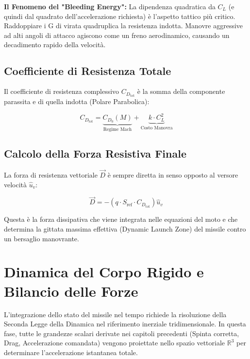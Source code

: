 \documentclass[12pt,a4paper]{article}
\begin{document}
\textbf{Il Fenomeno del "Bleeding Energy":}
La dipendenza quadratica da $C_L$ (e quindi dal quadrato dell'accelerazione richiesta) è l'aspetto tattico più critico. Raddoppiare i G di virata quadruplica la resistenza indotta. Manovre aggressive ad alti angoli di attacco agiscono come un freno aerodinamico, causando un decadimento rapido della velocità.

\subsection{Coefficiente di Resistenza Totale}
Il coefficiente di resistenza complessivo $C_{D_{\text{tot}}}$ è la somma della componente parassita e di quella indotta (Polare Parabolica):

\begin{equation}
    C_{D_{\text{tot}}} = \underbrace{C_{D_0}(M)}_{\text{Regime Mach}} + \underbrace{k \cdot C_L^2}_{\text{Costo Manovra}}
\end{equation}

\subsection{Calcolo della Forza Resistiva Finale}
La forza di resistenza vettoriale $\vec{D}$ è sempre diretta in senso opposto al versore velocità $\hat{u}_v$:

\begin{equation}
    \vec{D} = - \left( q \cdot S_{\text{ref}} \cdot C_{D_{\text{tot}}} \right) \hat{u}_v
\end{equation}

Questa è la forza dissipativa che viene integrata nelle equazioni del moto e che determina la gittata massima effettiva (Dynamic Launch Zone) del missile contro un bersaglio manovrante.
\section{Dinamica del Corpo Rigido e Bilancio delle Forze}

L'integrazione dello stato del missile nel tempo richiede la risoluzione della Seconda Legge della Dinamica nel riferimento inerziale tridimensionale.
In questa fase, tutte le grandezze scalari derivate nei capitoli precedenti (Spinta corretta, Drag, Accelerazione comandata) vengono proiettate nello spazio vettoriale $\mathbb{R}^3$ per determinare l'accelerazione istantanea totale.
\end{document}
